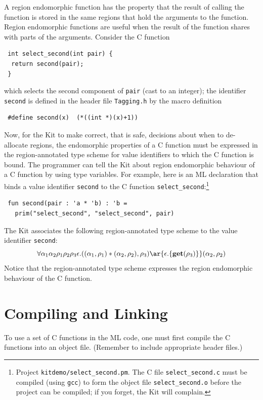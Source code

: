 \documentclass[12pt]{book}
\begin{document}
A region endomorphic function has the property that the result of
calling the function is stored in the same regions that hold the
arguments to the function. Region endomorphic functions are useful
when the result of the function shares with parts of the arguments.
Consider the C function
\begin{verbatim}
 int select_second(int pair) {
  return second(pair);
 }
\end{verbatim}
which selects the second component of {\tt pair} (cast to an
integer); the identifier {\tt second} is defined in the header
file {\tt Tagging.h} by the macro definition
\begin{verbatim}
 #define second(x)  (*((int *)(x)+1))
\end{verbatim}

Now, for the Kit to make correct, that is safe, decisions about when
to de-allocate regions, the endomorphic properties of a C function
must be expressed in the region-annotated type scheme for value identifiers
to which the C function is bound. The programmer can tell the Kit
about region endomorphic behaviour of a C function by using type
variables.  For example, here is an ML declaration that binds a value
identifier {\tt second} to the C function
\verb|select_second|:\footnote{Project {\tt kitdemo/select\_second.pm}. The C
  file {\tt select\_second.c} must be compiled (using {\tt gcc}) to
  form the object file {\tt select\_second.o} before the project can
  be compiled; if you forget, the Kit will complain.}
\begin{verbatim}
 fun second(pair : 'a * 'b) : 'b =
   prim("select_second", "select_second", pair)
\end{verbatim}
The Kit associates the following region-annotated type scheme to the value
identifier {\tt second}:
$$\forall \alpha_1\alpha_2\rho_1\rho_2\rho_3\epsilon.((\alpha_1,
\rho_1) * (\alpha_2, \rho_2), \rho_3) \ar{\epsilon.\{\Get(\rho_3)\}} (\alpha_2,
\rho_2)$$
Notice that the region-annotated type scheme expresses the region endomorphic
behaviour of the C function.

 
\section{Compiling and Linking}
\label{comp_and_link_with_C.sec}
To use a set of C functions in the ML code, one must first compile the
C functions into an object file. (Remember to include appropriate
header files.)
\end{document}
